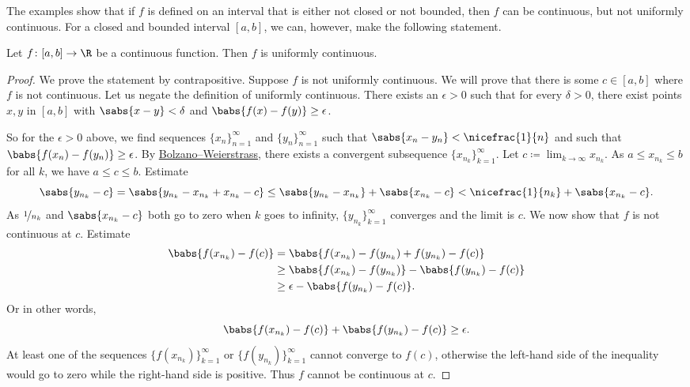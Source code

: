 The examples show that if $f$ is defined on an interval that is either not closed
or not bounded, then $f$ can be continuous, but not uniformly continuous.
For a closed and bounded interval $[a,b]$, we can, however,
make the following statement.

\begin{thm} \label{unifcont:thm}
Let $f \colon [a,b] \to \R$ be a continuous function.  Then $f$
is uniformly continuous.
\end{thm}

\begin{proof}
We prove the statement by contrapositive.
Suppose $f$ is not uniformly continuous.  We will prove
that there is some
$c \in [a,b]$ where $f$ is not continuous.  Let us negate
the definition of uniformly continuous.
There exists an $\epsilon > 0$
such that for every $\delta > 0$, there exist points $x, y$ in $[a,b]$ with
$\sabs{x-y} < \delta$ and $\babs{f(x)-f(y)} \geq \epsilon$.

So for the $\epsilon > 0$ above,
we find sequences $\{ x_n \}_{n=1}^\infty$ and $\{ y_n \}_{n=1}^\infty$ such that
$\sabs{x_n-y_n} < \nicefrac{1}{n}$ and such that $\babs{f(x_n)-f(y_n)} \geq
\epsilon$.  By
\hyperref[thm:bwseq]{Bolzano--Weierstrass},
there exists a convergent subsequence
$\{ x_{n_k} \}_{k=1}^\infty$.  Let $c \coloneqq \lim_{k\to\infty} x_{n_k}$.
As $a \leq x_{n_k} \leq b$ for all $k$, we have $a \leq c \leq b$.  Estimate
\begin{equation*}
\sabs{y_{n_k} - c} =
\sabs{y_{n_k} - x_{n_k} + x_{n_k} - c} \leq
\sabs{y_{n_k} - x_{n_k}}
+
\sabs{x_{n_k}-c}
<
\nicefrac{1}{n_k} 
+
\sabs{x_{n_k}-c} .
\end{equation*}
As $\nicefrac{1}{n_k}$ and $\sabs{x_{n_k}-c}$ both go to zero when
$k$ goes to infinity, $\{ y_{n_k} \}_{k=1}^\infty$ converges and the limit
is $c$.  We now show that $f$ is not continuous at $c$.
Estimate
\begin{equation*}
\begin{split}
\babs{f(x_{n_k}) - f(c)} & =
\babs{f(x_{n_k}) - f(y_{n_k}) + f(y_{n_k}) - f(c)} \\
& \geq
\babs{f(x_{n_k}) - f(y_{n_k})} - \babs{f(y_{n_k}) - f(c)} \\
& \geq
\epsilon - \babs{f(y_{n_k})-f(c)} .
\end{split}
\end{equation*}
Or in other words,
\begin{equation*}
\babs{f(x_{n_k})-f(c)} 
+
\babs{f(y_{n_k})-f(c)}  \geq
\epsilon .
\end{equation*}
At least one of the sequences $\bigl\{ f(x_{n_k}) \bigr\}_{k=1}^\infty$  or
$\bigl\{ f(y_{n_k}) \bigr\}_{k=1}^\infty$ cannot converge to $f(c)$, otherwise the
left-hand side of the inequality would go to zero while the right-hand side is positive.
Thus $f$ cannot be continuous at $c$.
\end{proof}

